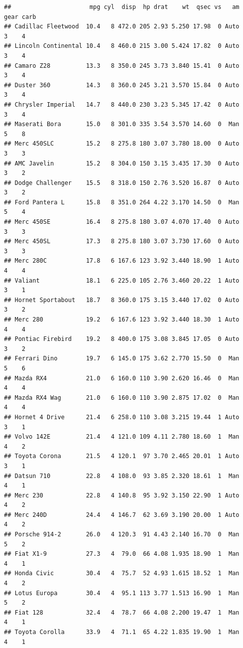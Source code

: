 \documentclass[]{book}
\begin{document}
\begin{verbatim}
##                      mpg cyl  disp  hp drat    wt  qsec vs   am gear carb
## Cadillac Fleetwood  10.4   8 472.0 205 2.93 5.250 17.98  0 Auto    3    4
## Lincoln Continental 10.4   8 460.0 215 3.00 5.424 17.82  0 Auto    3    4
## Camaro Z28          13.3   8 350.0 245 3.73 3.840 15.41  0 Auto    3    4
## Duster 360          14.3   8 360.0 245 3.21 3.570 15.84  0 Auto    3    4
## Chrysler Imperial   14.7   8 440.0 230 3.23 5.345 17.42  0 Auto    3    4
## Maserati Bora       15.0   8 301.0 335 3.54 3.570 14.60  0  Man    5    8
## Merc 450SLC         15.2   8 275.8 180 3.07 3.780 18.00  0 Auto    3    3
## AMC Javelin         15.2   8 304.0 150 3.15 3.435 17.30  0 Auto    3    2
## Dodge Challenger    15.5   8 318.0 150 2.76 3.520 16.87  0 Auto    3    2
## Ford Pantera L      15.8   8 351.0 264 4.22 3.170 14.50  0  Man    5    4
## Merc 450SE          16.4   8 275.8 180 3.07 4.070 17.40  0 Auto    3    3
## Merc 450SL          17.3   8 275.8 180 3.07 3.730 17.60  0 Auto    3    3
## Merc 280C           17.8   6 167.6 123 3.92 3.440 18.90  1 Auto    4    4
## Valiant             18.1   6 225.0 105 2.76 3.460 20.22  1 Auto    3    1
## Hornet Sportabout   18.7   8 360.0 175 3.15 3.440 17.02  0 Auto    3    2
## Merc 280            19.2   6 167.6 123 3.92 3.440 18.30  1 Auto    4    4
## Pontiac Firebird    19.2   8 400.0 175 3.08 3.845 17.05  0 Auto    3    2
## Ferrari Dino        19.7   6 145.0 175 3.62 2.770 15.50  0  Man    5    6
## Mazda RX4           21.0   6 160.0 110 3.90 2.620 16.46  0  Man    4    4
## Mazda RX4 Wag       21.0   6 160.0 110 3.90 2.875 17.02  0  Man    4    4
## Hornet 4 Drive      21.4   6 258.0 110 3.08 3.215 19.44  1 Auto    3    1
## Volvo 142E          21.4   4 121.0 109 4.11 2.780 18.60  1  Man    4    2
## Toyota Corona       21.5   4 120.1  97 3.70 2.465 20.01  1 Auto    3    1
## Datsun 710          22.8   4 108.0  93 3.85 2.320 18.61  1  Man    4    1
## Merc 230            22.8   4 140.8  95 3.92 3.150 22.90  1 Auto    4    2
## Merc 240D           24.4   4 146.7  62 3.69 3.190 20.00  1 Auto    4    2
## Porsche 914-2       26.0   4 120.3  91 4.43 2.140 16.70  0  Man    5    2
## Fiat X1-9           27.3   4  79.0  66 4.08 1.935 18.90  1  Man    4    1
## Honda Civic         30.4   4  75.7  52 4.93 1.615 18.52  1  Man    4    2
## Lotus Europa        30.4   4  95.1 113 3.77 1.513 16.90  1  Man    5    2
## Fiat 128            32.4   4  78.7  66 4.08 2.200 19.47  1  Man    4    1
## Toyota Corolla      33.9   4  71.1  65 4.22 1.835 19.90  1  Man    4    1
\end{verbatim}
\end{document}
